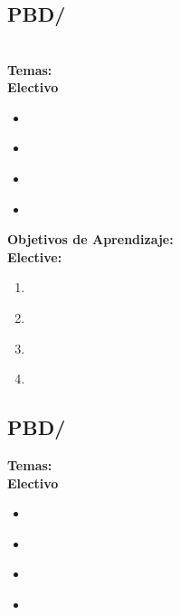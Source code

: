 \section{\PBD}\label{sec:BOK:PBD}
\PBDBOKDescription


\subsection{PBD/\PBDIntroduction}\label{sec:BOK:PBDIntroduction}
\PBDIntroductionDescription\\
\noindent \textbf{Temas:}\\
\noindent \textbf{Electivo}
\begin{itemize}
	\item \PBDIntroductionTopicOverview\label{sec:BOK:PBDIntroductionTopicOverview}
	\item \PBDIntroductionTopicProgramming\label{sec:BOK:PBDIntroductionTopicProgramming}
	\item \PBDIntroductionTopicOverviewOf\label{sec:BOK:PBDIntroductionTopicOverviewOf}
	\item \PBDIntroductionTopicProgrammingUnder\label{sec:BOK:PBDIntroductionTopicProgrammingUnder}
\end{itemize}


\noindent \textbf{Objetivos de Aprendizaje:}\\
\noindent \textbf{Elective:}
\begin{enumerate}
	\setcounter{enumi}{0}
	\item \PBDIntroductionLODescribeHowDevelopment\xspace[\PBDIntroductionLODescribeHowDevelopmentLevel]\label{sec:BOK:PBDIntroductionLODescribeHowDevelopment}
	\item \PBDIntroductionLOListCharacteristics\xspace[\PBDIntroductionLOListCharacteristicsLevel]\label{sec:BOK:PBDIntroductionLOListCharacteristics}
	\item \PBDIntroductionLOWriteAnd\xspace[\PBDIntroductionLOWriteAndLevel]\label{sec:BOK:PBDIntroductionLOWriteAnd}
	\item \PBDIntroductionLOListTheDisadvantages\xspace[\PBDIntroductionLOListTheDisadvantagesLevel]\label{sec:BOK:PBDIntroductionLOListTheDisadvantages}
\end{enumerate}


\subsection{PBD/\PBDWebPlatforms}\label{sec:BOK:PBDWebPlatforms}
\noindent \textbf{Temas:}\\
\noindent \textbf{Electivo}
\begin{itemize}
	\item \PBDWebPlatformsTopicWeb\label{sec:BOK:PBDWebPlatformsTopicWeb}
	\item \PBDWebPlatformsTopicWebPlatform\label{sec:BOK:PBDWebPlatformsTopicWebPlatform}
	\item \PBDWebPlatformsTopicSoftware\label{sec:BOK:PBDWebPlatformsTopicSoftware}
	\item \PBDWebPlatformsTopicWebStandards\label{sec:BOK:PBDWebPlatformsTopicWebStandards}
\end{itemize}


